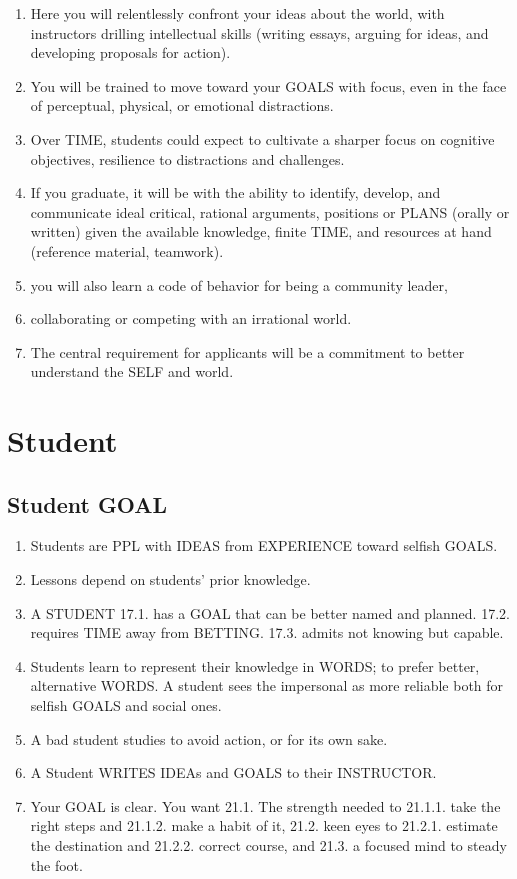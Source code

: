 \documentclass[
]{book}
\providecommand{\tightlist}{%
  \setlength{\itemsep}{0pt}\setlength{\parskip}{0pt}}
\begin{document}
\begin{enumerate}
\def\labelenumi{\arabic{enumi}.}
\setcounter{enumi}{7}
\tightlist
\item
  Here you will relentlessly confront your ideas about the world, with instructors
  drilling intellectual skills (writing essays, arguing for ideas, and developing
  proposals for action).
\item
  You will be trained to move toward your GOALS with focus, even in the face of
  perceptual, physical, or emotional distractions.
\item
  Over TIME, students could expect to cultivate a sharper focus on cognitive
  objectives, resilience to distractions and challenges.
\item
  If you graduate, it will be with the ability to identify, develop, and communicate
  ideal critical, rational arguments, positions or PLANS (orally or written) given the
  available knowledge, finite TIME, and resources at hand (reference material,
  teamwork).
\item
  you will also learn a code of behavior for being a community leader,
\item
  collaborating or competing with an irrational world.
\item
  The central requirement for applicants will be a commitment to better
  understand the SELF and world.
\end{enumerate}

\hypertarget{student}{%
\section{Student}\label{student}}

\hypertarget{student-goal}{%
\subsection{Student GOAL}\label{student-goal}}

\begin{enumerate}
\def\labelenumi{\arabic{enumi}.}
\setcounter{enumi}{14}
\tightlist
\item
  Students are PPL with IDEAS from EXPERIENCE toward selfish GOALS.
\item
  Lessons depend on students' prior knowledge.
\item
  A STUDENT
  17.1. has a GOAL that can be better named and planned.
  17.2. requires TIME away from BETTING.
  17.3. admits not knowing but capable.
\item
  Students learn to represent their knowledge in WORDS; to prefer better,
  alternative WORDS. A student sees the impersonal as more reliable both for
  selfish GOALS and social ones.
\item
  A bad student studies to avoid action, or for its own sake.
\item
  A Student WRITES IDEAs and GOALS to their INSTRUCTOR.
\item
  Your GOAL is clear. You want
  21.1. The strength needed to
  21.1.1. take the right steps and
  21.1.2. make a habit of it,
  21.2. keen eyes to
  21.2.1. estimate the destination and
  21.2.2. correct course, and
  21.3. a focused mind to steady the foot.
\end{enumerate}
\end{document}
